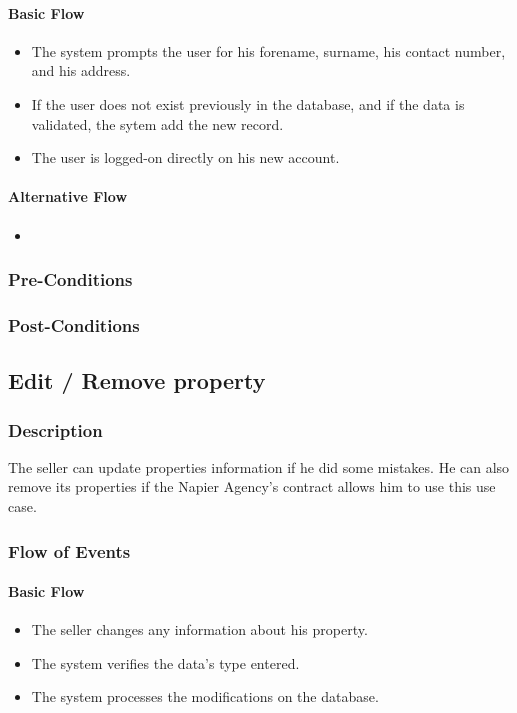 \documentclass[a4paper,12pt]{article}
\begin{document}
\paragraph{Basic Flow}
\begin{itemize}
\item The system prompts the user for his forename, surname, his contact number, and his address.
\item If the user does not exist previously in the database, and if the data is validated, the sytem add the new record.
\item The user is logged-on directly on his new account.
\end{itemize}
\paragraph{Alternative Flow}
\begin{itemize}
\item
\end{itemize}
\subsubsection{Pre-Conditions}
\subsubsection{Post-Conditions}

\subsection{Edit / Remove property}
\subsubsection{Description}
The seller can update properties information if he did some mistakes. He can also remove its properties if the Napier Agency's contract allows him to use this use case.
\subsubsection{Flow of Events}
\paragraph{Basic Flow}
\begin{itemize}
\item The seller changes any information about his property.
\item The system verifies the data's type entered.
\item The system processes the modifications on the database.
\end{itemize}
\end{document}
